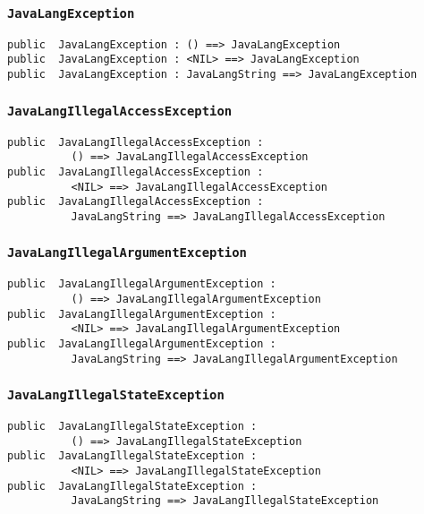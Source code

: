 \documentclass[\pformat,12pt]{article}
\begin{document}
\subsubsection{\texttt{JavaLangException}}
\begin{small}
\begin{verbatim}
public  JavaLangException : () ==> JavaLangException
public  JavaLangException : <NIL> ==> JavaLangException
public  JavaLangException : JavaLangString ==> JavaLangException
\end{verbatim}
\end{small}

\subsubsection{\texttt{JavaLangIllegalAccessException}}
\begin{small}
\begin{verbatim}
public  JavaLangIllegalAccessException : 
          () ==> JavaLangIllegalAccessException
public  JavaLangIllegalAccessException : 
          <NIL> ==> JavaLangIllegalAccessException
public  JavaLangIllegalAccessException : 
          JavaLangString ==> JavaLangIllegalAccessException
\end{verbatim}
\end{small}

\subsubsection{\texttt{JavaLangIllegalArgumentException}}
\begin{small}
\begin{verbatim}
public  JavaLangIllegalArgumentException : 
          () ==> JavaLangIllegalArgumentException
public  JavaLangIllegalArgumentException : 
          <NIL> ==> JavaLangIllegalArgumentException
public  JavaLangIllegalArgumentException : 
          JavaLangString ==> JavaLangIllegalArgumentException
\end{verbatim}
\end{small}

\subsubsection{\texttt{JavaLangIllegalStateException}}
\begin{small}
\begin{verbatim}
public  JavaLangIllegalStateException : 
          () ==> JavaLangIllegalStateException
public  JavaLangIllegalStateException : 
          <NIL> ==> JavaLangIllegalStateException
public  JavaLangIllegalStateException : 
          JavaLangString ==> JavaLangIllegalStateException
\end{verbatim}
\end{small}
\end{document}
